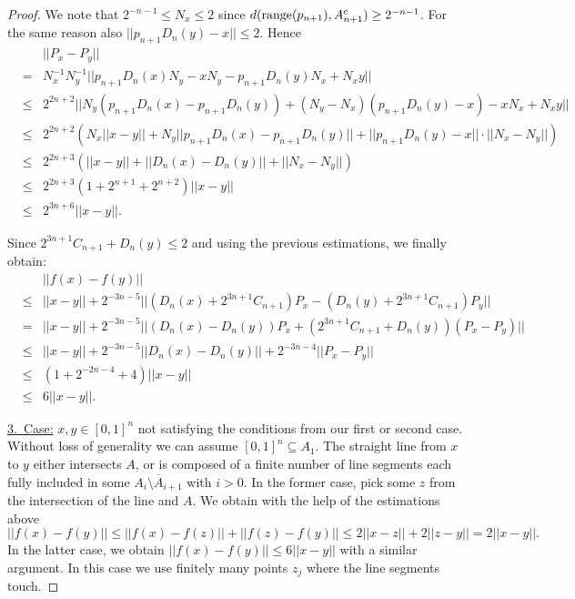 \documentclass[a4paper]{amsart}
\def\In{\subseteq}
\def\range{{\rm range}}
\def\cc{\mathrm c}
\theoremstyle{definition}
\begin{document}
\begin{proof}
We note that $2^{-n-1} \leq N_x \leq 2$ since $d(\range(p_{n+1}),A_{n+1}^\cc)\geq2^{-n-1}$. 
For the same reason also $||p_{n+1}D_n(y) - x||\leq 2$.
Hence
\begin{eqnarray*} 
&& ||P_x - P_y|| \\
& = & N_x^{-1}N_y^{-1}||p_{n+1}D_n(x)N_y - xN_y - p_{n+1}D_n(y)N_x + N_xy|| \\
& \leq & 2^{2n+2}||N_y \left (p_{n+1}D_n(x) - p_{n+1}D_n(y) \right )+ (N_y - N_x)(p_{n+1}D_n(y) - x) - xN_x + N_xy|| \\
& \leq & 2^{2n+2}(N_x||x - y||+N_y||p_{n+1}D_n(x) - p_{n+1}D_n(y)||+ ||p_{n+1}D_n(y) - x||\cdot ||N_x - N_y||)  \\
& \leq & 2^{2n+3}(||x - y||  + ||D_n(x) - D_n(y)|| + ||N_x-N_y||)  \\
& \leq & 2^{2n+3}(1+2^{n+1}+2^{n+2})||x - y||\\
&\leq& 2^{3n+6}||x-y||.
\end{eqnarray*}

Since $2^{3n+1}C_{n+1} + D_n(y)\leq2$ and using the previous estimations, we finally obtain:
\begin{eqnarray*} 
&& ||f(x) - f(y)||\\ 
& \leq & ||x - y|| + 2^{-3n-5}||\left (D_{n}(x) + 2^{3n+1}C_{n+1} \right) P_x - \left (D_{n}(y) + 2^{3n+1}C_{n+1} \right) P_y|| \\
& = & ||x - y|| + 2^{-3n-5}||\left (D_n(x) - D_n(y) \right )P_x + \left (2^{3n+1}C_{n+1} + D_n(y)\right )\left (P_x - P_y\right ) || \\
& \leq & ||x - y|| + 2^{-3n-5}||D_n(x) - D_n(y)|| + 2^{-3n-4}||P_x - P_y|| \\
&\leq & (1 + 2^{-2n-4}+4)||x - y||\\
& \leq & 6||x - y||.
\end{eqnarray*}

\underline{3.\ Case:} $x, y \in [0,1]^n$ not satisfying the conditions from our first or second case. 
Without loss of generality we can assume $[0,1]^n\In A_1$.
The straight line from $x$ to $y$ either intersects $A$, or is composed of a finite number of line segments each fully included in some $\overline{A_i \setminus A_{i+1}}$ with $i>0$. 
In the former case, pick some $z$ from the intersection of the line and $A$. 
We obtain with the help of the estimations above 
\[||f(x) - f(y)|| \leq ||f(x) - f(z)|| + ||f(z) - f(y)|| \leq 2||x - z|| + 2||z - y|| = 2||x - y||.\] 
In the latter case, we obtain $||f(x)-f(y)||\leq 6||x-y||$ with a similar argument. In this case we use finitely many points $z_j$ where the line segments touch.
\end{proof}
\end{document}
